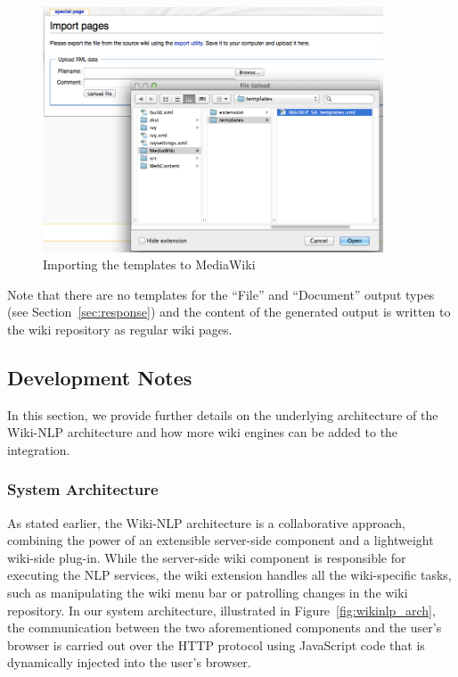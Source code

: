 \begin{figure}
\centering
\includegraphics[width=0.9\textwidth]{pictures/wiki_template_import.png}
\caption{Importing the \sa templates to MediaWiki}
\label{fig:wiki_template_import}
\end{figure}

Note that there are no templates for the ``File'' and ``Document'' output types (see Section~\ref{sec:response}) and the content of the generated output is written to the wiki repository as regular wiki pages.

\subsection{Development Notes}
In this section, we provide further details on the underlying architecture of the Wiki-NLP architecture and how more wiki engines can be added to the integration.

\subsubsection{System Architecture}
As stated earlier, the Wiki-NLP architecture is a collaborative approach, combining the power of an extensible server-side component and a lightweight wiki-side plug-in. While the server-side wiki component is responsible for executing the NLP services, the wiki extension handles all the wiki-specific tasks, such as manipulating the wiki menu bar or patrolling changes in the wiki repository. In our system architecture, illustrated in Figure~\ref{fig:wikinlp_arch}, the communication between the two aforementioned components and the user's browser is carried out over the HTTP protocol using JavaScript code that is dynamically injected into the user's browser.

